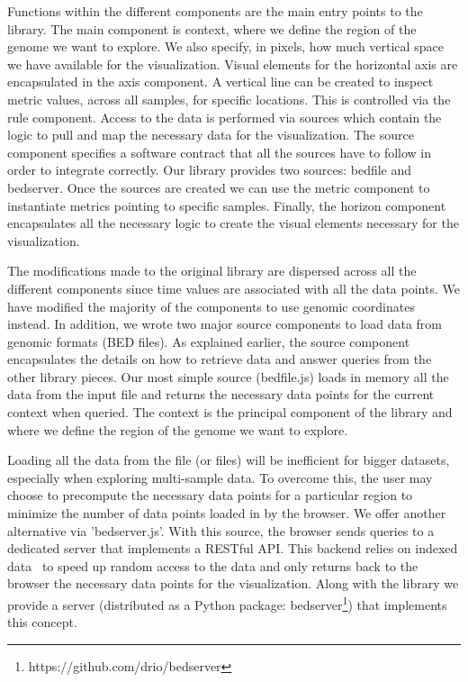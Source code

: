 \documentclass{bioinfo}
\begin{document}
Functions within the different components are the main entry points to the
library. The main component is context, where we define the region of the
genome we want to explore. We also specify, in pixels, how much vertical space
we have available for the visualization. Visual elements for the horizontal
axis are encapsulated in the axis component. A vertical line can be created to
inspect metric values, across all samples, for specific locations. This is
controlled via the rule component. Access to the data is performed via sources
which contain the logic to pull and map the necessary data for the
visualization. The source component specifies a software contract that all the
sources have to follow in order to integrate correctly. Our library provides
two sources: bedfile and bedserver. Once the sources are created we can use the
metric component to instantiate metrics pointing to specific samples. Finally,
the horizon component encapsulates all the necessary logic to create the visual
elements necessary for the visualization.

The modifications made to the original library are dispersed across all the
different components since time values are associated with all the data points.
We have modified the majority of the components to use genomic coordinates
instead. In addition, we wrote two major source components to load data from
genomic formats (BED files). As explained earlier, the source component
encapsulates the details on how to retrieve data and answer queries from the
other library pieces. Our most simple source (bedfile.js) loads in memory all
the data from the input file and returns the necessary data points for the
current context when queried. The context is the principal component of the
library and where we define the region of the genome we want to explore.

Loading all the data from the file (or files) will be inefficient for bigger
datasets, especially when exploring multi-sample data. To overcome this, the
user may choose to precompute the necessary data points for a particular region
to minimize the number of data points loaded in by the browser. We offer
another alternative via 'bedserver.js'. With this source, the browser sends
queries to a dedicated server that implements a RESTful API. This backend
relies on indexed data~\citep{tabix-li} to speed up random access to the data
and only returns back to the browser the necessary data points for the
visualization.  Along with the library we provide a server (distributed as a
Python package: bedserver\footnote{https://github.com/drio/bedserver}) that
implements this concept.
\end{document}

